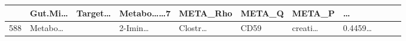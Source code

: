 \documentclass[
]{article}
\begin{document}
\begin{longtable}[]{@{}lllllllllll@{}}
\begin{minipage}[b]{0.09\columnwidth}
\end{minipage} & \begin{minipage}[b]{0.07\columnwidth}\raggedright
Gut.Mi\ldots{}\strut
\end{minipage} & \begin{minipage}[b]{0.07\columnwidth}\raggedright
Target\ldots{}\strut
\end{minipage} & \begin{minipage}[b]{0.09\columnwidth}\raggedright
Metabo\ldots\ldots7\strut
\end{minipage} & \begin{minipage}[b]{0.07\columnwidth}\raggedright
META\_Rho\strut
\end{minipage} & \begin{minipage}[b]{0.07\columnwidth}\raggedright
META\_Q\strut
\end{minipage} & \begin{minipage}[b]{0.07\columnwidth}\raggedright
META\_P\strut
\end{minipage} & \begin{minipage}[b]{0.03\columnwidth}\raggedright
\ldots{}\strut
\end{minipage}\tabularnewline
\midrule
\endhead
\begin{minipage}[t]{0.03\columnwidth}\raggedright
588\strut
\end{minipage} & \begin{minipage}[t]{0.07\columnwidth}\raggedright
Metabo\ldots{}\strut
\end{minipage} & \begin{minipage}[t]{0.07\columnwidth}\raggedright
\strut
\end{minipage} & \begin{minipage}[t]{0.09\columnwidth}\raggedright
2-Imin\ldots{}\strut
\end{minipage} & \begin{minipage}[t]{0.07\columnwidth}\raggedright
Clostr\ldots{}\strut
\end{minipage} & \begin{minipage}[t]{0.07\columnwidth}\raggedright
CD59\strut
\end{minipage} & \begin{minipage}[t]{0.09\columnwidth}\raggedright
creati\ldots{}\strut
\end{minipage} & \begin{minipage}[t]{0.07\columnwidth}\raggedright
0.4459\ldots{}\strut
\end{minipage} & \begin{minipage}[t]{0.07\columnwidth}\raggedright

\end{minipage}
\end{longtable}
\end{document}
